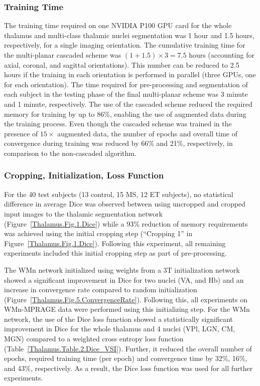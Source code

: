 \subsubsection{Training Time}
The training time required on one NVIDIA P100 GPU card for the whole thalamus and multi-class thalamic nuclei segmentation was 1 hour and 1.5 hours, respectively, for a single imaging orientation. The cumulative training time for the multi-planar cascaded scheme was $(1+1.5)\times3=7.5$ hours (accounting for axial, coronal, and sagittal orientations). This number can be reduced to 2.5 hours if the training in each orientation is performed in parallel (three GPUs, one for each orientation). The time required for pre-processing and segmentation of each subject in the testing phase of the final multi-planar scheme was 3 minute and 1 minute, respectively. The use of the cascaded scheme reduced the required memory for training by up to 86\%, enabling the use of augmented data during the training process. Even though the cascaded scheme was trained in the presence of $15\times $ augmented data, the number of epochs and overall time of convergence during training was reduced by 66\% and 21\%, respectively, in comparison to the non-cascaded algorithm.

\subsubsection{Cropping, Initialization, Loss Function }
For the 40 test subjects (13 control, 15 MS, 12 ET subjects), no statistical difference in average Dice was observed between using uncropped and cropped input images to the thalamic segmentation network (Figure~\ref{Thalamus.Fig.1.Dice}) while a 93\% reduction of memory requirements was achieved using the initial cropping step (``Cropping 1'' in Figure~\ref{Thalamus.Fig.1.Dice}). Following this experiment, all remaining experiments included this initial cropping step as part of pre-processing.

The WMn network initialized using weights from a 3T initialization network showed a significant improvement in Dice for two nuclei (VA, and Hb) and an increase in convergence rate compared to random initialization (Figure~\ref{Thalamus.Fig.5.ConvergenceRate}). Following this, all experiments on WMn-MPRAGE data were performed using this initializing step. For the WMn network, the use of the Dice loss function showed a statistically significant improvement in Dice for the whole thalamus and 4 nuclei (VPl, LGN, CM, MGN) compared to a weighted cross entropy loss function (Table~\ref{Thalamus.Table.2.Dice_VSI}). Further, it reduced the overall number of epochs, required training time (per epoch) and convergence time by 32\%, 16\%, and 43\%, respectively. As a result, the Dice loss function was used for all further experiments.

